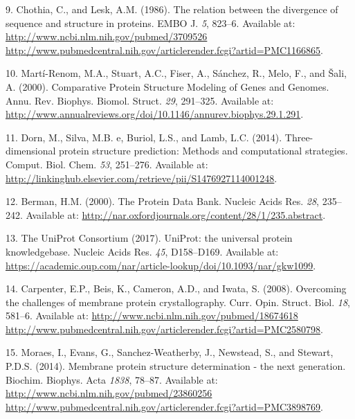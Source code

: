 \documentclass[11pt,a4paper,twoside]{book}
\theoremstyle{definition}
\theoremstyle{definition}
\theoremstyle{remark}
\begin{document}
\hypertarget{ref-Chothia1986}{}
9. Chothia, C., and Lesk, A.M. (1986). The relation between the
divergence of sequence and structure in proteins. EMBO J. \emph{5},
823--6. Available at:
\href{http://www.ncbi.nlm.nih.gov/pubmed/3709526\%20http://www.pubmedcentral.nih.gov/articlerender.fcgi?artid=PMC1166865}{http://www.ncbi.nlm.nih.gov/pubmed/3709526 http://www.pubmedcentral.nih.gov/articlerender.fcgi?artid=PMC1166865}.

\hypertarget{ref-Marti-Renom2000}{}
10. Martí-Renom, M.A., Stuart, A.C., Fiser, A., Sánchez, R., Melo, F.,
and Šali, A. (2000). Comparative Protein Structure Modeling of Genes and
Genomes. Annu. Rev. Biophys. Biomol. Struct. \emph{29}, 291--325.
Available at:
\url{http://www.annualreviews.org/doi/10.1146/annurev.biophys.29.1.291}.

\hypertarget{ref-Dorn2014}{}
11. Dorn, M., Silva, M.B. e, Buriol, L.S., and Lamb, L.C. (2014).
Three-dimensional protein structure prediction: Methods and
computational strategies. Comput. Biol. Chem. \emph{53}, 251--276.
Available at:
\url{http://linkinghub.elsevier.com/retrieve/pii/S1476927114001248}.

\hypertarget{ref-Berman2000}{}
12. Berman, H.M. (2000). The Protein Data Bank. Nucleic Acids Res.
\emph{28}, 235--242. Available at:
\url{http://nar.oxfordjournals.org/content/28/1/235.abstract}.

\hypertarget{ref-TheUniProtConsortium2017}{}
13. The UniProt Consortium (2017). UniProt: the universal protein
knowledgebase. Nucleic Acids Res. \emph{45}, D158--D169. Available at:
\url{https://academic.oup.com/nar/article-lookup/doi/10.1093/nar/gkw1099}.

\hypertarget{ref-Carpenter2008}{}
14. Carpenter, E.P., Beis, K., Cameron, A.D., and Iwata, S. (2008).
Overcoming the challenges of membrane protein crystallography. Curr.
Opin. Struct. Biol. \emph{18}, 581--6. Available at:
\href{http://www.ncbi.nlm.nih.gov/pubmed/18674618\%20http://www.pubmedcentral.nih.gov/articlerender.fcgi?artid=PMC2580798}{http://www.ncbi.nlm.nih.gov/pubmed/18674618 http://www.pubmedcentral.nih.gov/articlerender.fcgi?artid=PMC2580798}.

\hypertarget{ref-Moraes2014}{}
15. Moraes, I., Evans, G., Sanchez-Weatherby, J., Newstead, S., and
Stewart, P.D.S. (2014). Membrane protein structure determination - the
next generation. Biochim. Biophys. Acta \emph{1838}, 78--87. Available
at:
\href{http://www.ncbi.nlm.nih.gov/pubmed/23860256\%20http://www.pubmedcentral.nih.gov/articlerender.fcgi?artid=PMC3898769}{http://www.ncbi.nlm.nih.gov/pubmed/23860256 http://www.pubmedcentral.nih.gov/articlerender.fcgi?artid=PMC3898769}.
\end{document}
